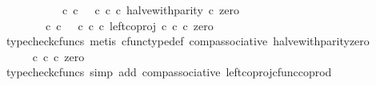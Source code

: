 \begin{isabellebody}
\ \ \isamarkupfalse%
\ {\isacharminus}{\kern0pt}\isanewline
\ \ \ \ \isamarkupfalse%
\ {\isachardoublequoteopen}{\isacharparenleft}{\kern0pt}{\isacharparenleft}{\kern0pt}{\isasymf}\ {\isasymcirc}\isactrlsub c\ {\isasymbeta}\isactrlbsub {\isasymnat}\isactrlsub c\isactrlesub {\isacharparenright}{\kern0pt}\ {\isasymamalg}\ {\isacharparenleft}{\kern0pt}{\isasymt}\ {\isasymcirc}\isactrlsub c\ {\isasymbeta}\isactrlbsub {\isasymnat}\isactrlsub c\isactrlesub {\isacharparenright}{\kern0pt}\ {\isasymcirc}\isactrlsub c\ halve{\isacharunderscore}{\kern0pt}with{\isacharunderscore}{\kern0pt}parity{\isacharparenright}{\kern0pt}\ {\isasymcirc}\isactrlsub c\ zero\isanewline
\ \ \ \ \ \ {\isacharequal}{\kern0pt}\ {\isacharparenleft}{\kern0pt}{\isasymf}\ {\isasymcirc}\isactrlsub c\ {\isasymbeta}\isactrlbsub {\isasymnat}\isactrlsub c\isactrlesub {\isacharparenright}{\kern0pt}\ {\isasymamalg}\ {\isacharparenleft}{\kern0pt}{\isasymt}\ {\isasymcirc}\isactrlsub c\ {\isasymbeta}\isactrlbsub {\isasymnat}\isactrlsub c\isactrlesub {\isacharparenright}{\kern0pt}\ {\isasymcirc}\isactrlsub c\ left{\isacharunderscore}{\kern0pt}coproj\ {\isasymnat}\isactrlsub c\ {\isasymnat}\isactrlsub c\ {\isasymcirc}\isactrlsub c\ zero{\isachardoublequoteclose}\isanewline
\ \ \ \ \ \ \isamarkupfalse%
\ {\isacharparenleft}{\kern0pt}typecheck{\isacharunderscore}{\kern0pt}cfuncs{\isacharcomma}{\kern0pt}\ metis\ cfunc{\isacharunderscore}{\kern0pt}type{\isacharunderscore}{\kern0pt}def\ comp{\isacharunderscore}{\kern0pt}associative\ halve{\isacharunderscore}{\kern0pt}with{\isacharunderscore}{\kern0pt}parity{\isacharunderscore}{\kern0pt}zero{\isacharparenright}{\kern0pt}\isanewline
\ \ \ \ \isamarkupfalse%
\ \isamarkupfalse%
\ {\isachardoublequoteopen}{\isachardot}{\kern0pt}{\isachardot}{\kern0pt}{\isachardot}{\kern0pt}\ {\isacharequal}{\kern0pt}\ {\isacharparenleft}{\kern0pt}{\isasymf}\ {\isasymcirc}\isactrlsub c\ {\isasymbeta}\isactrlbsub {\isasymnat}\isactrlsub c\isactrlesub {\isacharparenright}{\kern0pt}\ {\isasymcirc}\isactrlsub c\ zero{\isachardoublequoteclose}\isanewline
\ \ \ \ \ \ \isamarkupfalse%
\ {\isacharparenleft}{\kern0pt}typecheck{\isacharunderscore}{\kern0pt}cfuncs{\isacharcomma}{\kern0pt}\ simp\ add{\isacharcolon}{\kern0pt}\ comp{\isacharunderscore}{\kern0pt}associative{}\ left{\isacharunderscore}{\kern0pt}coproj{\isacharunderscore}{\kern0pt}cfunc{\isacharunderscore}{\kern0pt}coprod{\isacharparenright}{\kern0pt}\isanewline
\ \ \ \ \isamarkupfalse%
\ \isamarkupfalse%

\end{isabellebody}
